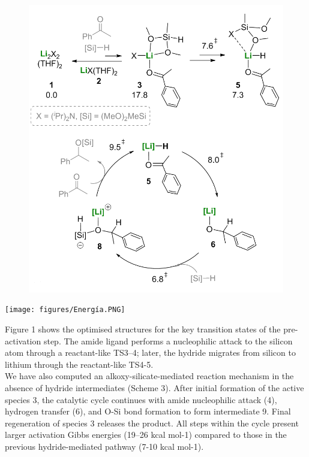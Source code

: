 \documentclass[journal=jacsat,manuscript=article]{achemso}
\begin{document}
	\begin{center}
		\begin{minipage}{0.6\textwidth} 
			\begin{figure}[H]
				\includegraphics[width=\textwidth]{figures/Ciclo.PNG}
			\end{figure}
		\end{minipage}
		
		\begin{minipage}{0.6\textwidth} 
			\begin{scheme}[H]
				\texttt{[image: figures/Energía.PNG]}
				\caption{\label{Scheme2} Computed (a) pre-activation step and catalytic cycle, and (b) reaction profile for the hydride-mediated Li-catalysed hydrosilylation of acetophenone. All Gibbs energies are given in THF in kcal mol-1.}
			\end{scheme}
		\end{minipage}
	\end{center}
	
	Figure 1 shows the optimised structures for the key transition states of the pre-activation step. The amide ligand performs a nucleophilic attack to the silicon atom through a reactant-like TS3–4; later, the hydride migrates from silicon to lithium	through the reactant-like TS4-5.
	\\
	We have also computed an alkoxy-silicate-mediated reaction mechanism in the absence of hydride intermediates (Scheme 3). After initial formation of the active species 3, the catalytic cycle continues with amide nucleophilic attack (4), hydrogen transfer (6), and O-Si bond formation to form intermediate 9. Final regeneration of species 3 releases the product. All steps within the cycle present larger activation Gibbs energies	(19–26 kcal mol-1) compared to those in the previous hydride-mediated pathway (7-10 kcal mol-1).
	
\end{document}
